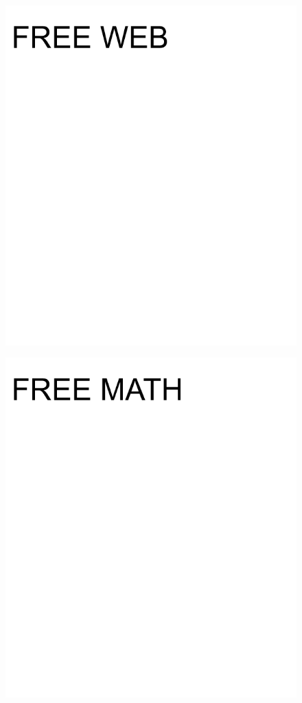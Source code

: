 \documentclass[17pt]{extreport}
\begin{document}
        \begin{figure}
		\centering
		\includegraphics[width=8.0in]{imageset/uploadimages/freeweb.png}
	\end{figure}	
        \begin{figure}
		\centering
		\includegraphics[width=8.0in]{imageset/uploadimages/freemath.png}
	\end{figure}	
\end{document}
